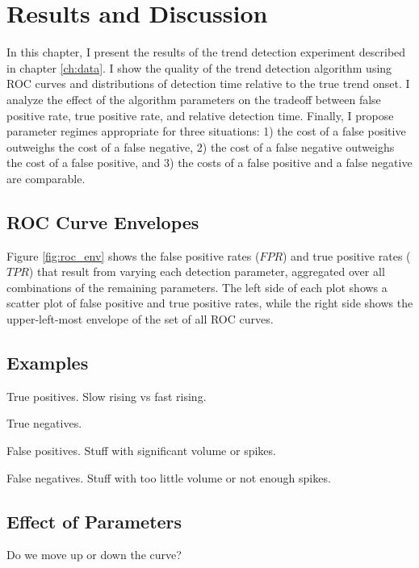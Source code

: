 \chapter{Results and Discussion}
\label{ch:results}

In this chapter, I present the results of the trend detection experiment
described in chapter \ref{ch:data}. I show the quality of the trend detection
algorithm using ROC curves and distributions of detection time relative to the
true trend onset. I analyze the effect of the algorithm parameters on the
tradeoff between false positive rate, true positive rate, and relative detection
time. Finally, I propose parameter regimes appropriate for three situations: 1)
the cost of a false positive outweighs the cost of a false negative, 2) the cost
of a false negative outweighs the cost of a false positive, and 3) the costs of
a false positive and a false negative are comparable.

\section{ROC Curve Envelopes}

Figure \ref{fig:roc_env} shows the false positive rates ($FPR$) and true
positive rates ($TPR$) that result from varying each detection parameter,
aggregated over all combinations of the remaining parameters. The left side of
each plot shows a scatter plot of false positive and true positive rates, while
the right side shows the upper-left-most envelope of the set of all ROC curves.

\section{Examples} %

True positives. Slow rising vs fast rising.

True negatives.

False positives. Stuff with significant volume or spikes.

False negatives. Stuff with too little volume or not enough spikes.

\section{Effect of Parameters}

Do we move up or down the curve?

